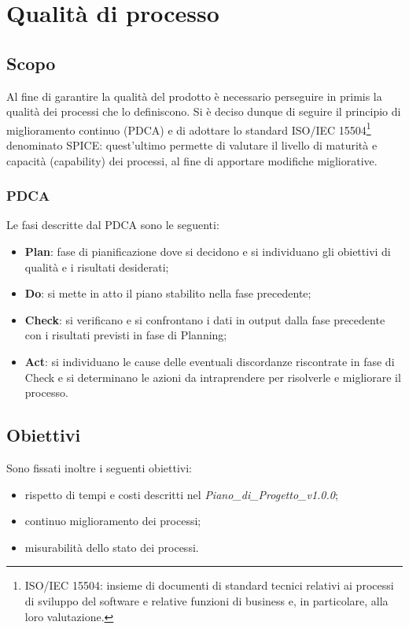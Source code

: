 \section{Qualità di processo}
\subsection{Scopo}
Al fine di garantire la qualità del prodotto è necessario perseguire in primis la qualità dei processi che lo definiscono. Si è deciso dunque di seguire il principio di miglioramento continuo (PDCA) e di adottare lo standard ISO/IEC 15504\footnote{ISO/IEC 15504: insieme di documenti di standard tecnici relativi ai processi di sviluppo del software e relative funzioni di business e, in particolare, alla loro valutazione.} denominato SPICE\glo: quest'ultimo permette di valutare il livello di maturità e capacità (capability) dei processi, al fine di apportare modifiche migliorative. 
\subsubsection*{PDCA}
Le fasi descritte dal PDCA sono le seguenti: 
\begin{itemize}
\item \textbf{Plan}: fase di pianificazione dove si decidono e si individuano gli obiettivi di qualità e i risultati desiderati;
\item \textbf{Do}: si mette in atto il piano stabilito nella fase precedente;
\item \textbf{Check}: si verificano e si confrontano i dati in output dalla fase precedente con i risultati previsti in fase di Planning;
\item \textbf{Act}: si individuano le cause delle eventuali discordanze riscontrate in fase di Check e si determinano le azioni da intraprendere per risolverle e migliorare il processo.
\end{itemize}
\subsection{Obiettivi}
Sono fissati inoltre i seguenti obiettivi: \begin{itemize}
\item rispetto di tempi e costi descritti nel \textit{Piano\_di\_Progetto\_v1.0.0};
\item continuo miglioramento dei processi;
\item misurabilità dello stato dei processi.
\end{itemize}
